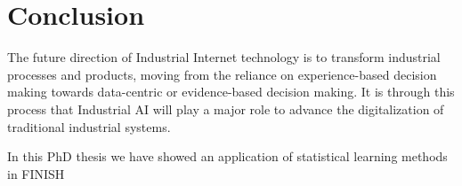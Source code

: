 \chapter*{Conclusion}
\thispagestyle{empty}

The future direction of Industrial Internet technology is to transform industrial processes and products, moving from the reliance on experience-based decision making towards data-centric or evidence-based decision making. It is through this process that Industrial AI will play a major role to advance the digitalization of traditional industrial systems.

In this PhD thesis we have showed an application of statistical learning methods in FINISH

\clearpage